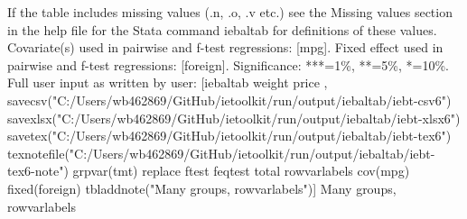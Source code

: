 If the table includes missing values (.n, .o, .v etc.) see the Missing values section in the help file for the Stata command iebaltab for definitions of these values. Covariate(s) used in pairwise and f-test regressions: [mpg]. Fixed effect used in pairwise and f-test regressions: [foreign]. Significance: ***=1\%, **=5\%, *=10\%. Full user input as written by user: [iebaltab weight price , savecsv("C:/Users/wb462869/GitHub/ietoolkit/run/output/iebaltab/iebt-csv6") savexlsx("C:/Users/wb462869/GitHub/ietoolkit/run/output/iebaltab/iebt-xlsx6") savetex("C:/Users/wb462869/GitHub/ietoolkit/run/output/iebaltab/iebt-tex6") texnotefile("C:/Users/wb462869/GitHub/ietoolkit/run/output/iebaltab/iebt-tex6-note") grpvar(tmt) replace ftest feqtest total rowvarlabels cov(mpg) fixed(foreign) tbladdnote("Many groups, rowvarlabels")] Many groups, rowvarlabels
